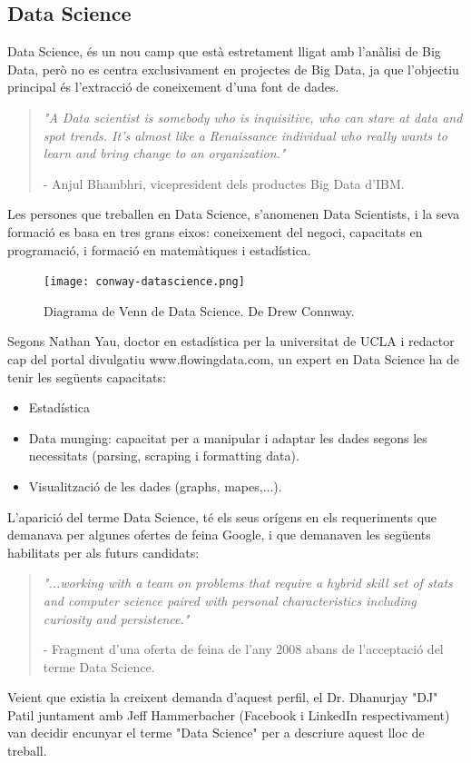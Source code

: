 \documentclass[12pt,a4paper,openright,oneside]{article}
\numberwithin{equation}{section}
\theoremstyle{definition}
\begin{document}
\subsection{Data Science}
Data Science, és un nou camp que està estretament lligat amb l'anàlisi de Big Data, però no es centra exclusivament en projectes de Big Data, ja que l'objectiu principal és l'extracció de coneixement d'una font de dades.

\begin{quote}
\emph{"A Data scientist is somebody who is inquisitive, who can stare at data and spot trends. It's almost like a Renaissance individual who really wants to learn and bring change to an organization."}
\begin{flushright}
- Anjul Bhambhri, vicepresident dels productes Big Data d'IBM.
\end{flushright}
\end{quote}

Les persones que treballen en Data Science, s'anomenen Data Scientists, i la seva formació es basa en tres grans eixos: coneixement del negoci, capacitats en programació, i formació en matemàtiques i estadística.

\begin{figure}[htbp]
\centering
\texttt{[image: conway-datascience.png]}
\caption{Diagrama de Venn de Data Science. De Drew Connway.}
\end{figure}
\newpage
Segons Nathan Yau, doctor en estadística per la universitat de UCLA i redactor cap del portal divulgatiu www.flowingdata.com, un expert en Data Science ha de tenir les següents capacitats:
\begin{itemize}
\item Estadística
\item Data munging: capacitat per a manipular i adaptar les dades segons les necessitats (parsing, scraping i formatting data).
\item Visualització de les dades (graphs, mapes,...).
\end{itemize}
L'aparició del terme Data Science, té els seus orígens en els requeriments que demanava per algunes ofertes de feina Google, i que demanaven les següents habilitats per als futurs candidats:
\begin{quote}
\emph{"...working with a team on problems that require a hybrid skill set of stats and computer science paired with personal characteristics including curiosity and persistence."}
\begin{flushright}
- Fragment d'una oferta de feina de l'any 2008 abans de l'acceptació del terme Data Science.
\end{flushright}
\end{quote}
Veient que existia la creixent demanda d'aquest perfil, el Dr. Dhanurjay "DJ" Patil juntament amb Jeff Hammerbacher (Facebook i LinkedIn respectivament) van decidir encunyar el terme "Data Science" per a descriure aquest lloc de treball. 
\newpage
\end{document}
